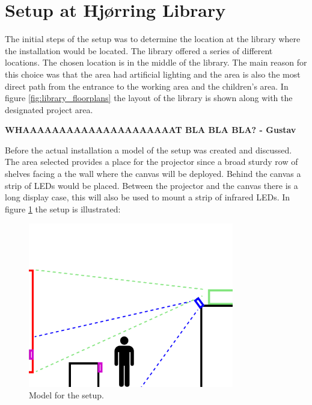 \section{Setup at Hj{\o}rring Library}
The initial steps of the setup was to determine the location at the library where the installation would be located. The library offered a series of different locations. The chosen location is in the middle of the library. The main reason for this choice was that the area had artificial lighting and the area is also the most direct path from the entrance to the working area and the children's area. In figure \ref{fig:library_floorplans} the layout of the library is shown along with the designated project area.

\textbf{WHAAAAAAAAAAAAAAAAAAAAAT BLA BLA BLA? - Gustav}

Before the actual installation a model of the setup was created and discussed. The area selected provides a place for the projector since a broad sturdy row of shelves facing a the wall where the canvas will be deployed. Behind the canvas a strip of LEDs would be placed. Between the projector and the canvas there is a long display case, this will also be used to mount a strip of infrared LEDs. In figure \ref{fig:setup_model} the setup is illustrated:

\begin{figure}[htbp] 
\centering 
\includegraphics[width=0.8\textwidth]{Pictures/Setup/sideview_camera_with_person_two_strips.png} 
\caption{Model for the setup.} 
\label{fig:setup_model} 
\end{figure}

